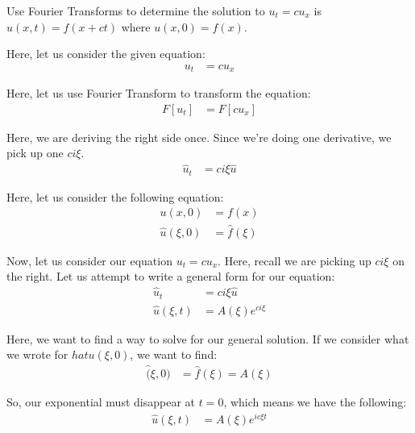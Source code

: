 \item Use Fourier Transforms to determine the solution to $u_t = cu_x$ is $u(x, t) = f(x + ct)$ where $u(x, 0) = f(x)$.

Here, let us consider the given equation:
%
\begin{align}
  u_t & = cu_x
\end{align}

Here, let us use Fourier Transform to transform the equation:
%
\begin{align}
  F[u_t] & = F[cu_x]
\end{align}

Here, we are deriving the right side once. Since we're doing one derivative, we pick up one $c i \xi$.
%
\begin{align}
  \hat u_t & = c i \xi \hat u
\end{align}





Here, let us consider the following equation:
%
\begin{align}
  u(x, 0) & = f(x)\\
  \hat u(\xi, 0) & = \hat f(\xi)
\end{align}


Now, let us consider our equation $u_t = cu_x$. Here, recall we are picking up $c i \xi$ on the right. Let us attempt to write a general form for our equation:
%
\begin{align}
  \hat u_t & = c i \xi \hat u\\
  \hat u(\xi, t) & = A(\xi)e^{c i \xi}
\end{align}

Here, we want to find a way to solve for our general solution. If we consider what we wrote for $hat u(\xi, 0)$, we want to find:
%
\begin{align}
  \hat(\xi, 0) & = \hat f(\xi) = A(\xi)
\end{align}

So, our exponential must disappear at $t = 0$, which means we have the following:
%
\begin{align}
  \hat u(\xi, t) & = A(\xi) e^{i c \xi t}
\end{align}

